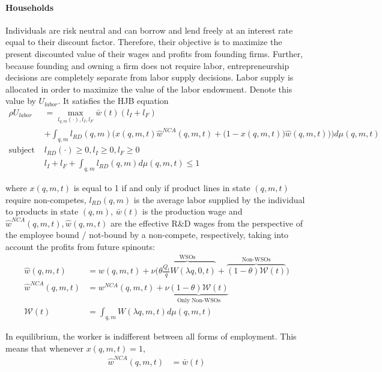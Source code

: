 \documentclass[11pt,english]{article}
\theoremstyle{remark}
\begin{document}
\paragraph{Households}

Individuals are risk neutral and can borrow and lend freely at an interest rate equal to their discount factor. Therefore, their objective is to maximize the present discounted value of their wages and profits from founding firms. Further, because founding and owning a firm does not require labor, entrepreneurship decisions are completely separate from labor supply decisions. Labor supply is allocated in order to maximize the value of the labor endowment. Denote this value by $U_{labor}$. It satisfies the HJB equation
\begin{align}
	\rho U_{labor} &= \max_{l_{q,m}(\cdot),l_I,l_F} \bar{w}(t) (l_I + l_F) \nonumber\\
	&+ \int_{q,m} l_{RD} (q,m) \Bigg(x(q,m,t) \hat{w}^{NCA}(q,m,t) + \Big(1-x(q,m,t) \Big)\hat{w}(q,m,t))  \Bigg) d\mu(q,m,t) \nonumber  \\
	\textrm{subject to: }  & l_{RD}(\cdot) \ge 0, l_I \ge 0, l_F \ge 0  \nonumber \\
	& l_I + l_F + \int_{q,m} l_{RD}(q,m) d\mu(q,m,t) \le 1 
\end{align}

where $x(q,m,t)$ is equal to 1 if and only if product lines in state $(q,m,t)$ require non-competes, $l_{RD}(q,m)$ is the average labor supplied by the individual to products in state $(q,m)$,  $\bar{w}(t)$ is the production wage and $\hat{w}^{NCA}(q,m,t),\hat{w}(q,m,t)$ are the effective R\&D wages from the perspective of the employee bound / not-bound by a non-compete, respectively, taking into account the profits from future spinouts: 
\begin{align}
	\hat{w}(q,m,t) &=  w(q,m,t) + \nu \Big( \overbrace{\theta \frac{Q_t}{q} W(\lambda q,0,t)}^{\textrm{WSOs}} + \overbrace{(1-\theta) \mathcal{W}(t)}^{\textrm{Non-WSOs}} \Big) \label{worker_effective_wage}\\
	\hat{w}^{NCA}(q,m,t) &= w^{NCA}(q,m,t) + \nu \underbrace{(1-\theta) \mathcal{W}(t)}_{\textrm{Only Non-WSOs}} \label{worker_effective_wage_NCA}\\ 
	\mathcal{W}(t) &= \int_{q,m} W(\lambda q,m,t) d\mu(q,m,t)
\end{align}

In equilibrium, the worker is indifferent between all forms of employment. This means that whenever $x(q,m,t) = 1$, 
\begin{align}
\hat{w}^{NCA}(q,m,t) &= \bar{w}(t) \label{wage_rd_NCA}
\end{align}
\end{document}
